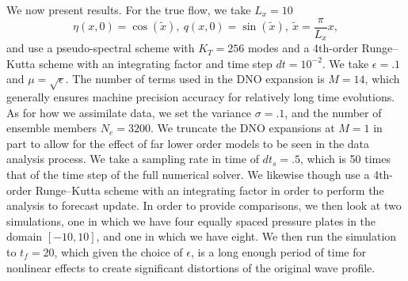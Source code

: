 We now present results.  For the true flow, we take $L_{x}=10$
\[
\eta(x,0) = \cos(\tilde{x}), ~ q(x,0) = \sin(\tilde{x}), ~ \tilde{x} = \frac{\pi}{L_{x}}x,
\]
and use a pseudo-spectral scheme with $K_{T}=256$ modes and a 4th-order Runge--Kutta scheme with an integrating factor and time step $dt=10^{-2}$. We take $\epsilon=.1$ and $\mu=\sqrt{\epsilon}$.  The number of terms used in the DNO expansion is $M=14$, which generally ensures machine precision accuracy for relatively long time evolutions.  As for how we assimilate data, we set the variance $\sigma=.1$, and the number of ensemble members $N_{e}=3200$.  We truncate the DNO expansions at $M=1$ in part to allow for the effect of far lower order models to be seen in the data analysis process.  We take a sampling rate in time of $dt_{s}=.5$, which is 50 times that of the time step of the full numerical solver.  We likewise though use a 4th-order Runge--Kutta scheme with an integrating factor in order to perform the analysis to forecast update.  In order to provide comparisons, we then look at two simulations, one in which we have four equally spaced pressure plates in the domain $[-10,10]$, and one in which we have eight.  We then run the simulation to $t_{f}=20$, which given the choice of $\epsilon$, is a long enough period of time for nonlinear effects to create significant distortions of the original wave profile.  

